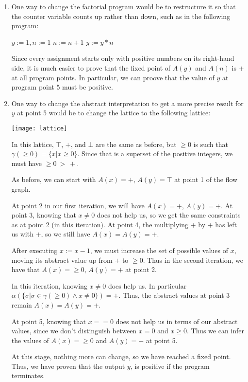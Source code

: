 \documentclass{article}
\begin{document}
\begin{enumerate}
  \item One way to change the factorial program would be to restructure it so
  that the counter variable counts up rather than down, such as in the
  following program:
  \begin{algorithmic}
  \STATE $y := 1, n := 1$
    \STATE $n := n + 1$
    \STATE $y := y * n$
  \ENDWHILE %
  \end{algorithmic}
  Since every assignment starts only with positive numbers on its
  right-hand side, it is much easier to prove that the fixed point of $A(y)$
  and $A(n)$ is $+$ at all program points.  In particular, we can proove that
  the value of $y$ at program point 5 must be positive.
  
  \newpage
  \newcommand{\nonneg}{\ge\!\!0}
  \item One way to change the abstract interpretation to get a more precise
  result for $y$ at point 5 would be to change the lattice to the following
  lattice:

  \begin{center}
    \texttt{[image: lattice]}
  \end{center}

  In this lattice, $\top$, $+$, and $\bot$ are the same as before, but $\nonneg$
  is such that $\gamma(\nonneg) = \{ x | x \ge 0 \}$. Since that is a superset of
  the positive integers, we must have $\nonneg \  > \  +$.

  As before, we can start with $A(x) = +$, $A(y) = \top$ at point 1 of the flow
  graph.
  
  At point 2 in our first iteration, we will have $A(x) = +$, $A(y) = +$.
  At point 3, knowing that $x\ne 0$ does not help us, so we get the same
  constraints as at point 2 (in this iteration).
  At point 4, the multiplying $+$ by $+$ has left us with $+$, so we still have
  $A(x) = A(y) = +$.
  
  After executing $x := x - 1$, we must increase the set of possible values of
  $x$, moving its abstract value up from $+$ to $\nonneg$.
  Thus in the second iteration, we have that $A(x) = \nonneg$, $A(y) = +$ at
  point 2.
  
  In this iteration, knowing $x\ne0$ does help us.  In particular
  $
  \alpha(\{\sigma | \sigma \in \gamma(\nonneg) \wedge x \ne 0 \}) = +
  $.
  Thus, the abstract values at point 3 remain $A(x) = A(y) = +$.
  
  At point 5, knowing that $x==0$ does not help us in terms of our abstract
  values, since we don't distinguish between $x=0$ and $x \ge 0$.
  Thus we can infer the values of $A(x) = \nonneg$ and $A(y) = +$ at point 5.
  
  At this stage, nothing more can change, so we have reached a fixed point. 
  Thus, we have proven that the output $y$, is positive if the program
  terminates.
\end{enumerate}
\end{document}
